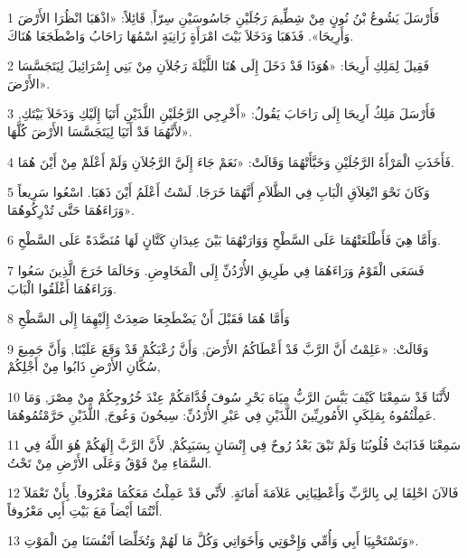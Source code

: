 \par 1 فَأَرْسَلَ يَشُوعُ بْنُ نُونٍ مِنْ شِطِّيمَ رَجُلَيْنِ جَاسُوسَيْنِ سِرّاً, قَائِلاً: «اذْهَبَا انْظُرَا الأَرْضَ وَأَرِيحَا». فَذَهَبَا وَدَخَلاَ بَيْتَ امْرَأَةٍ زَانِيَةٍ اسْمُهَا رَاحَابُ وَاضْطَجَعَا هُنَاكَ.
\par 2 فَقِيلَ لِمَلِكِ أَرِيحَا: «هُوَذَا قَدْ دَخَلَ إِلَى هُنَا اللَّيْلَةَ رَجُلاَنِ مِنْ بَنِي إِسْرَائِيلَ لِيَتَجَسَّسَا الأَرْضَ».
\par 3 فَأَرْسَلَ مَلِكُ أَرِيحَا إِلَى رَاحَابَ يَقُولُ: «أَخْرِجِي الرَّجُلَيْنِ اللَّذَيْنِ أَتَيَا إِلَيْكِ وَدَخَلاَ بَيْتَكِ, لأَنَّهُمَا قَدْ أَتَيَا لِيَتَجَسَّسَا الأَرْضَ كُلَّهَا».
\par 4 فَأَخَذَتِ الْمَرْأَةُ الرَّجُلَيْنِ وَخَبَّأَتْهُمَا وَقَالَتْ: «نَعَمْ جَاءَ إِلَيَّ الرَّجُلاَنِ وَلَمْ أَعْلَمْ مِنْ أَيْنَ هُمَا.
\par 5 وَكَانَ نَحْوَ انْغِلاَقِ الْبَابِ فِي الظَّلاَمِ أَنَّهُمَا خَرَجَا. لَسْتُ أَعْلَمُ أَيْنَ ذَهَبَا. اسْعُوا سَرِيعاً وَرَاءَهُمَا حَتَّى تُدْرِكُوهُمَا».
\par 6 وَأَمَّا هِيَ فَأَطْلَعَتْهُمَا عَلَى السَّطْحِ وَوَارَتْهُمَا بَيْنَ عِيدَانِ كَتَّانٍ لَهَا مُنَضَّدَةً عَلَى السَّطْحِ.
\par 7 فَسَعَى الْقَوْمُ وَرَاءَهُمَا فِي طَرِيقِ الأُرْدُنِّ إِلَى الْمَخَاوِضِ. وَحَالَمَا خَرَجَ الَّذِينَ سَعُوا وَرَاءَهُمَا أَغْلَقُوا الْبَابَ.
\par 8 وَأَمَّا هُمَا فَقَبْلَ أَنْ يَضْطَجِعَا صَعِدَتْ إِلَيْهِمَا إِلَى السَّطْحِ
\par 9 وَقَالَتْ: «عَلِمْتُ أَنَّ الرَّبَّ قَدْ أَعْطَاكُمُ الأَرْضَ, وَأَنَّ رُعْبَكُمْ قَدْ وَقَعَ عَلَيْنَا, وَأَنَّ جَمِيعَ سُكَّانِ الأَرْضِ ذَابُوا مِنْ أَجْلِكُمْ,
\par 10 لأَنَّنَا قَدْ سَمِعْنَا كَيْفَ يَبَّسَ الرَّبُّ مِيَاهَ بَحْرِ سُوفَ قُدَّامَكُمْ عِنْدَ خُرُوجِكُمْ مِنْ مِصْرَ, وَمَا عَمِلْتُمُوهُ بِمَلِكَيِ الأَمُورِيِّينَ اللَّذَيْنِ فِي عَبْرِ الأُرْدُنِّ: سِيحُونَ وَعُوجَ, اللَّذَيْنِ حَرَّمْتُمُوهُمَا.
\par 11 سَمِعْنَا فَذَابَتْ قُلُوبُنَا وَلَمْ تَبْقَ بَعْدُ رُوحٌ فِي إِنْسَانٍ بِسَبَبِكُمْ, لأَنَّ الرَّبَّ إِلَهَكُمْ هُوَ اللَّهُ فِي السَّمَاءِ مِنْ فَوْقُ وَعَلَى الأَرْضِ مِنْ تَحْتُ.
\par 12 فَالآنَ احْلِفَا لِي بِالرَّبِّ وَأَعْطِيَانِي عَلاَمَةَ أَمَانَةٍ. لأَنِّي قَدْ عَمِلْتُ مَعَكُمَا مَعْرُوفاً. بِأَنْ تَعْمَلاَ أَنْتُمَا أَيْضاً مَعَ بَيْتِ أَبِي مَعْرُوفاً.
\par 13 وَتَسْتَحْيِيَا أَبِي وَأُمِّي وَإِخْوَتِي وَأَخَوَاتِي وَكُلَّ مَا لَهُمْ وَتُخَلِّصَا أَنْفُسَنَا مِنَ الْمَوْتِ».
